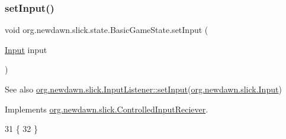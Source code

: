 \subsubsection{\texorpdfstring{set\+Input()}{setInput()}}
{\footnotesize\ttfamily void org.\+newdawn.\+slick.\+state.\+Basic\+Game\+State.\+set\+Input (\begin{DoxyParamCaption}\item[{\mbox{\hyperlink{classorg_1_1newdawn_1_1slick_1_1_input}{Input}}}]{input }\end{DoxyParamCaption})\hspace{0.3cm}{\ttfamily [inline]}}

\begin{DoxySeeAlso}{See also}
\mbox{\hyperlink{interfaceorg_1_1newdawn_1_1slick_1_1_controlled_input_reciever_ab838ca221a429b05c0b53aea9b4fe72f}{org.\+newdawn.\+slick.\+Input\+Listener\+::set\+Input}}(\mbox{\hyperlink{classorg_1_1newdawn_1_1slick_1_1_input}{org.\+newdawn.\+slick.\+Input}}) 
\end{DoxySeeAlso}


Implements \mbox{\hyperlink{interfaceorg_1_1newdawn_1_1slick_1_1_controlled_input_reciever_ab838ca221a429b05c0b53aea9b4fe72f}{org.\+newdawn.\+slick.\+Controlled\+Input\+Reciever}}.


\begin{DoxyCode}
31                                       \{
32     \}
\end{DoxyCode}
